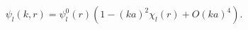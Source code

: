 \begin{equation}
\label{Eq_0307}
\psi_l(k,r) = \psi^0_l(r) (1 - (ka)^2 \chi_l(r) + O(ka)^4).
\end{equation}

